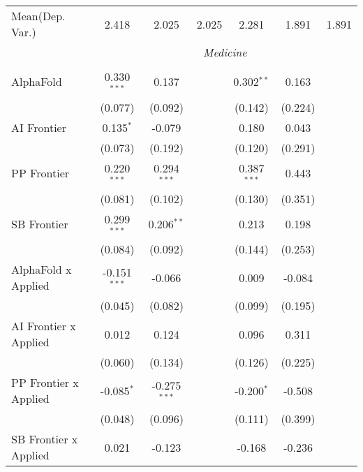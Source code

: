 \begin{tabular}{lcccccc}
Mean(Dep. Var.) & 2.418 & 2.025 & 2.025 & 2.281 & 1.891 & 1.891 \\
 & \multicolumn{6}{c}{\textit{Medicine}} \\ \\
   AlphaFold                      & 0.330$^{***}$  & 0.137          &                & 0.302$^{**}$  & 0.163   &   \\   
                                  & (0.077)        & (0.092)        &                & (0.142)       & (0.224) &   \\   
   AI Frontier                    & 0.135$^{*}$    & -0.079         &                & 0.180         & 0.043   &   \\   
                                  & (0.073)        & (0.192)        &                & (0.120)       & (0.291) &   \\   
   PP Frontier                    & 0.220$^{***}$  & 0.294$^{***}$  &                & 0.387$^{***}$ & 0.443   &   \\   
                                  & (0.081)        & (0.102)        &                & (0.130)       & (0.351) &   \\   
   SB Frontier                    & 0.299$^{***}$  & 0.206$^{**}$   &                & 0.213         & 0.198   &   \\   
                                  & (0.084)        & (0.092)        &                & (0.144)       & (0.253) &   \\   
   AlphaFold x Applied            & -0.151$^{***}$ & -0.066         &                & 0.009         & -0.084  &   \\   
                                  & (0.045)        & (0.082)        &                & (0.099)       & (0.195) &   \\   
   AI Frontier x Applied          & 0.012          & 0.124          &                & 0.096         & 0.311   &   \\   
                                  & (0.060)        & (0.134)        &                & (0.126)       & (0.225) &   \\   
   PP Frontier x Applied          & -0.085$^{*}$   & -0.275$^{***}$ &                & -0.200$^{*}$  & -0.508  &   \\   
                                  & (0.048)        & (0.096)        &                & (0.111)       & (0.399) &   \\   
   SB Frontier x Applied          & 0.021          & -0.123         &                & -0.168        & -0.236  &   \\   

\end{tabular}
